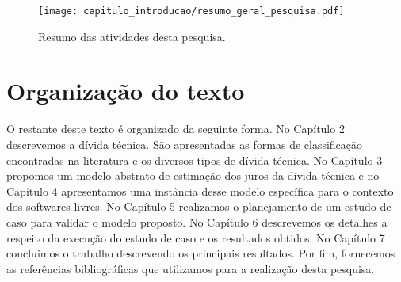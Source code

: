  \begin{figure}[H]
  \centering
  \texttt{[image: capitulo\_introducao/resumo\_geral\_pesquisa.pdf]}
  \caption{Resumo das atividades desta pesquisa.}
  \label{fig:resumo_geral_pesquisa} 
\end{figure}










\section{Organização do texto}

O restante deste texto é organizado da seguinte forma. No Capítulo 2 descrevemos a dívida técnica. São apresentadas as formas de classificação encontradas na literatura e os diversos tipos de dívida técnica. No Capítulo 3 propomos um modelo abstrato de estimação dos juros da dívida técnica e no Capítulo 4 apresentamos uma instância desse modelo específica para o contexto dos softwares livres.  No Capítulo 5 realizamos o planejamento de um estudo de caso para validar o modelo  proposto. No Capítulo 6 descrevemos os detalhes a respeito da execução do estudo de caso e os resultados obtidos.  No Capítulo 7 concluimos o trabalho descrevendo os principais resultados. Por fim, fornecemos as referências bibliográficas que utilizamos para a realização desta pesquisa.






























